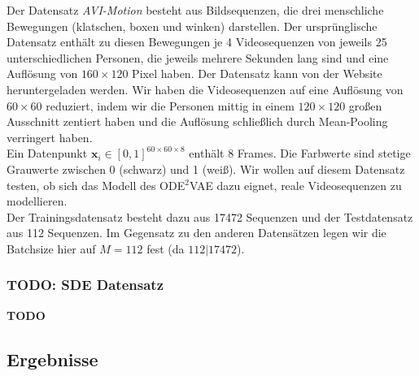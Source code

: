 \documentclass[12pt]{article}
\newcommand{\x}{\mathbf{x}_i}
\begin{document}
	Der Datensatz \emph{AVI-Motion} besteht aus Bildsequenzen, die drei menschliche Bewegungen (klatschen, boxen und winken) darstellen. Der ursprünglische Datensatz enthält zu diesen Bewegungen je 4 Videosequenzen von jeweils 25 unterschiedlichen Personen, die jeweils mehrere Sekunden lang sind und eine Auflösung von $160\times120$ Pixel haben. Der Datensatz kann von der Website \cite{Dataset} heruntergeladen werden.
	Wir haben die Videosequenzen auf eine Auflösung von $60\times60$ reduziert, indem wir die Personen mittig in einem $120\times120$ großen Ausschnitt zentiert haben und die Auflösung schließlich durch Mean-Pooling verringert haben. \\
	Ein Datenpunkt $\x\in [0,1]^{60\times 60\times 8}$ enthält 8 Frames. Die Farbwerte sind stetige Grauwerte zwischen 0 (schwarz) und 1 (weiß). Wir wollen auf diesem Datensatz testen, ob sich das Modell des ODE$^2$VAE dazu eignet, reale Videosequenzen zu modellieren.\\
	Der Trainingsdatensatz besteht dazu aus 17472 Sequenzen und der Testdatensatz aus 112 Sequenzen. Im Gegensatz zu den anderen Datensätzen legen wir die Batchsize hier auf $M=112$ fest (da $112 | 17472$).

	\subsubsection{TODO: SDE Datensatz}
	\textbf{TODO}
	\subsection[Ergebnisse]{Ergebnisse}
\end{document}
